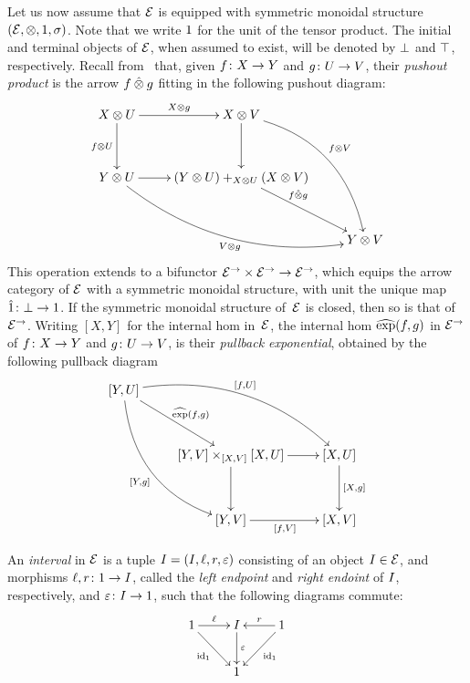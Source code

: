 \documentclass[reqno,10pt,a4paper,oneside]{amsart}
\begin{document}
Let us now assume that $\mathcal{E}$ is equipped with symmetric monoidal structure $(\mathcal{E}, \otimes, 1, \sigma)$.
Note that we write $1$ for the unit of the tensor product. The initial and terminal objects of $\mathcal{E}$, when assumed to exist, will be denoted by $\bot$ and $\top$, respectively. Recall from~\cite[Section 4]{riehl-verity:reedy} that, given $f \colon X \to Y$ and $g \colon U \to V$, their \emph{pushout product} is the arrow $f \mathbin{\hat{\otimes}} g$ fitting in the following pushout diagram:
\[
\xymatrix@R=1.2cm{
X \otimes U \ar[r]^{X \otimes g}  \ar[d]_{f \otimes U} & X \otimes V \ar@/^2pc/[ddr]^{f \otimes V} \ar[d] & \\ 
Y \otimes U \ar@/_2pc/[drr]_{V \otimes g} \ar[r] & (Y \otimes U) +_{X \otimes U} (X \otimes V) \ar[dr]^-(.35){f \hatotimes g}  & \\ 
 & & Y \otimes V} 
 \]
This operation extends to a bifunctor  $\mathcal{E}^{\to} \times \mathcal{E}^{\to} \to \mathcal{E}^{\to}$, which equips the arrow category of $\mathcal{E}$ with a symmetric monoidal structure, with unit the unique map $\hat{1} \colon \bot \to 1$.
If the symmetric
monoidal structure of~$\mathcal{E}$ is closed, then so is that of $\mathcal{E}^\to$. Writing $[X,Y]$ for the internal hom in~$\mathcal{E}$,
the internal hom $\operatorname{\widehat{exp}}(f,g)$ in $\mathcal{E}^\to$ of $f \colon X \to Y$ and $g \colon U \to V$, is their \emph{pullback exponential}, obtained by the following pullback diagram
\[
\xymatrix@R=1.2cm{
[Y, U] \ar@/^2pc/[drr]^{[f,U]} \ar@/_2pc/[ddr]_{[Y,g]}  \ar[dr]^{\hatexp(f,g)} & & \\ 
 & [Y,V] \times_{[X,V]} [X,U]  \ar[d] \ar[r] & [X,U] \ar[d]^{[X,g]} \\
 & [Y,V] \ar[r]_{[f,V]} & [X,V] }
 \]





\begin{definition} An \emph{interval} in $\mathcal{E}$ is a tuple $I = (I, \ell, r, \varepsilon)$ consisting of  an object $I \in \mathcal{E}$, 
and morphisms $\ell, r \colon 1 \to I$, called the \emph{left endpoint} and
\emph{right endoint} of $I$, respectively, 
 and $\varepsilon \colon I \to 1$,   such that the following diagrams commute:
\[
\xymatrix{
\unit \ar[r]^\intervall \ar[dr]_{\id_\unit} & \interval \ar[d]^-{\varepsilon} & \unit \ar[dl]^{\id_\unit} \ar[l]_{\intervalr}  \\
 & \unit & }
 \]
\end{definition}

\medskip
\end{document}
